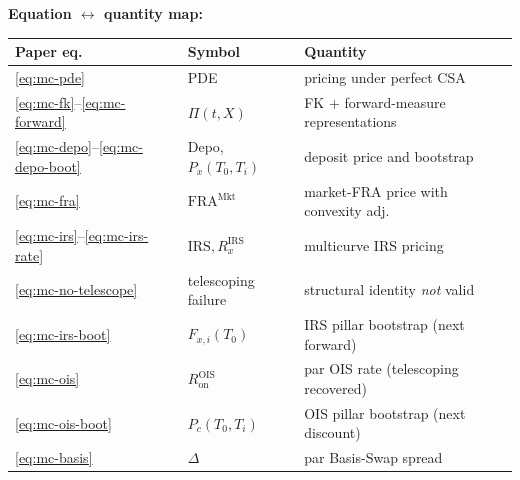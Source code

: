 \documentclass[11pt,a4paper]{article}
\begin{document}
\begin{validation}
\textbf{Equation $\leftrightarrow$ quantity map:}

\smallskip
\begin{tabular}{@{}p{2.8cm}p{3.8cm}p{6.2cm}@{}}
\toprule
Paper eq.                                & Symbol                            & Quantity \\
\midrule
\eqref{eq:mc-pde}                        & PDE                               & pricing under perfect CSA \\
\eqref{eq:mc-fk}--\eqref{eq:mc-forward}  & $\Pi(t, X)$                       & FK + forward-measure representations \\
\eqref{eq:mc-depo}--\eqref{eq:mc-depo-boot} & Depo, $P_x(T_0, T_i)$         & deposit price and bootstrap \\
\eqref{eq:mc-fra}                        & $\text{FRA}^{\text{Mkt}}$        & market-FRA price with convexity adj. \\
\eqref{eq:mc-irs}--\eqref{eq:mc-irs-rate} & $\text{IRS}, R^{\text{IRS}}_x$  & multicurve IRS pricing \\
\eqref{eq:mc-no-telescope}               & telescoping failure              & structural identity \emph{not} valid \\
\eqref{eq:mc-irs-boot}                   & $F_{x,i}(T_0)$                    & IRS pillar bootstrap (next forward) \\
\eqref{eq:mc-ois}                        & $R^{\text{OIS}}_{\text{on}}$      & par OIS rate (telescoping recovered) \\
\eqref{eq:mc-ois-boot}                   & $P_c(T_0, T_i)$                   & OIS pillar bootstrap (next discount) \\
\eqref{eq:mc-basis}                      & $\Delta$                          & par Basis-Swap spread \\
\bottomrule
\end{tabular}
\smallskip


\end{validation}
\end{document}
